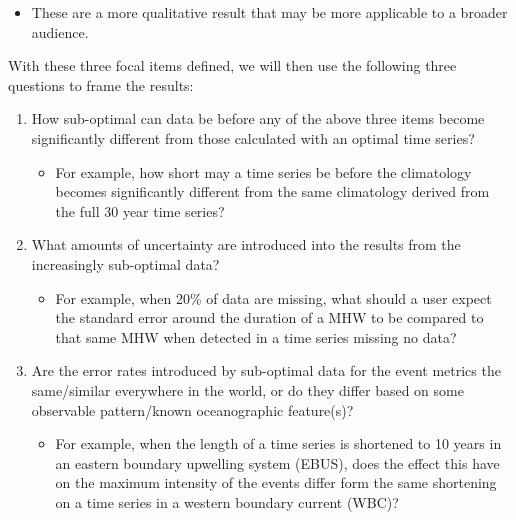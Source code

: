 \documentclass[]{article}
\providecommand{\tightlist}{%
  \setlength{\itemsep}{0pt}\setlength{\parskip}{0pt}}
\begin{document}
{\begin{enumerate}
  \begin{itemize}
  \tightlist
  \item
    These are a more qualitative result that may be more applicable to a
    broader audience.
  \end{itemize}
\end{enumerate}

With these three focal items defined, we will then use the following
three questions to frame the results:

\begin{enumerate}
\def\labelenumi{\arabic{enumi})}
\tightlist
\item
  How sub-optimal can data be before any of the above three items become
  significantly different from those calculated with an optimal time
  series?

  \begin{itemize}
  \tightlist
  \item
    For example, how short may a time series be before the climatology
    becomes significantly different from the same climatology derived
    from the full 30 year time series?
  \end{itemize}
\item
  What amounts of uncertainty are introduced into the results from the
  increasingly sub-optimal data?

  \begin{itemize}
  \tightlist
  \item
    For example, when 20\% of data are missing, what should a user
    expect the standard error around the duration of a MHW to be
    compared to that same MHW when detected in a time series missing no
    data?
  \end{itemize}
\item
  Are the error rates introduced by sub-optimal data for the event
  metrics the same/similar everywhere in the world, or do they differ
  based on some observable pattern/known oceanographic feature(s)?

  \begin{itemize}
  \tightlist
  \item
    For example, when the length of a time series is shortened to 10
    years in an eastern boundary upwelling system (EBUS), does the
    effect this have on the maximum intensity of the events differ form
    the same shortening on a time series in a western boundary current
    (WBC)?
  \end{itemize}
\end{enumerate}

}
\end{document}
